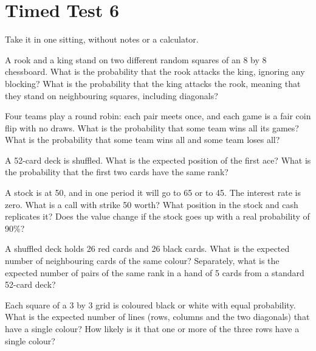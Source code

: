 \chapter{Timed Test 6}\label{ch:iv1:timed-test-6}

\begin{ivtrains}
Take it in one sitting, without notes or a calculator.
\end{ivtrains}


\begin{question}\label{iq:iv1:timed-test-6:1}
A rook and a king stand on two different random squares of an 8 by 8 chessboard. What is the probability that the rook attacks the king, ignoring any blocking? What is the probability that the king attacks the rook, meaning that they stand on neighbouring squares, including diagonals?
\end{question}

\begin{question}\label{iq:iv1:timed-test-6:2}
Four teams play a round robin: each pair meets once, and each game is a fair coin flip with no draws. What is the probability that some team wins all its games? What is the probability that some team wins all and some team loses all?
\end{question}

\begin{question}\label{iq:iv1:timed-test-6:3}
A 52-card deck is shuffled. What is the expected position of the first ace? What is the probability that the first two cards have the same rank?
\end{question}

\begin{question}\label{iq:iv1:timed-test-6:4}
A stock is at 50, and in one period it will go to 65 or to 45. The interest rate is zero. What is a call with strike 50 worth? What position in the stock and cash replicates it? Does the value change if the stock goes up with a real probability of 90\%?
\end{question}

\begin{question}\label{iq:iv1:timed-test-6:5}
A shuffled deck holds 26 red cards and 26 black cards. What is the expected number of neighbouring cards of the same colour? Separately, what is the expected number of pairs of the same rank in a hand of 5 cards from a standard 52-card deck?
\end{question}

\begin{question}\label{iq:iv1:timed-test-6:6}
Each square of a 3 by 3 grid is coloured black or white with equal probability. What is the expected number of lines (rows, columns and the two diagonals) that have a single colour? How likely is it that one or more of the three rows have a single colour?
\end{question}

